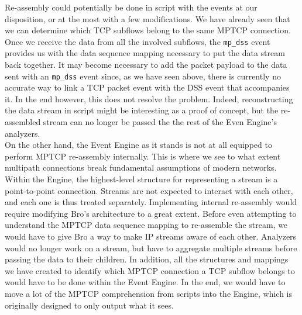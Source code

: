 Re-assembly could potentially be done in script with the events at our disposition, or at the most with a few modifications. We have already seen that we can determine which TCP subflows belong to the same MPTCP connection. Once we receive the data from all the involved subflows, the \texttt{mp\_dss} event provides us with the data sequence mapping necessary to put the data stream back together. It may become necessary to add the packet payload to the data sent with an \texttt{mp\_dss} event since, as we have seen above, there is currently no accurate way to link a TCP packet event with the DSS event that accompanies it. In the end however, this does not resolve the problem. Indeed, reconstructing the data stream in script might be interesting as a proof of concept, but the re-assembled stream can no longer be passed the the rest of the Even Engine's analyzers. \\

On the other hand, the Event Engine as it stands is not at all equipped to perform MPTCP re-assembly internally. This is where we see to what extent multipath connections break fundamental assumptions of modern networks. Within the Engine, the highest-level structure for representing a stream is a point-to-point connection. Streams are not expected to interact with each other, and each one is thus treated separately. Implementing internal re-assembly would require modifying Bro's architecture to a great extent. Before even attempting to understand the MPTCP data sequence mapping to re-assemble the stream, we would have to give Bro a way to make IP streams aware of each other. Analyzers would no longer work on a stream, but have to aggregate multiple streams before passing the data to their children. In addition, all the structures and mappings we have created to identify which MPTCP connection a TCP subflow belongs to would have to be done within the Event Engine. In the end, we would have to move a lot of the MPTCP comprehension from scripts into the Engine, which is originally designed to only output what it sees.
